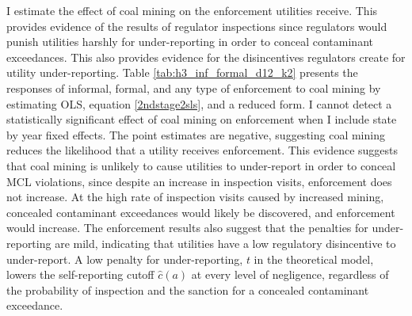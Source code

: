\documentclass[12pt]{article}
\begin{document}
I estimate the effect of coal mining on the enforcement utilities receive. This provides evidence of the results of regulator inspections since regulators would punish utilities harshly for under-reporting in order to conceal contaminant exceedances. This also provides evidence for the disincentives regulators create for utility under-reporting. Table \ref{tab:h3_inf_formal_d12_k2} presents the responses of informal, formal, and any type of enforcement to coal mining by estimating OLS, equation \ref{2ndstage2sls}, and a reduced form. I cannot detect a statistically significant effect of coal mining on enforcement when I include state by year fixed effects. The point estimates are negative, suggesting coal mining reduces the likelihood that a utility receives enforcement. This evidence suggests that coal mining is unlikely to cause utilities to under-report in order to conceal MCL violations, since despite an increase in inspection visits, enforcement does not increase. At the high rate of inspection visits caused by increased mining, concealed contaminant exceedances would likely be discovered, and enforcement would increase. The enforcement results also suggest that the penalties for under-reporting are mild, indicating that utilities have a low regulatory disincentive to under-report. A low penalty for under-reporting, $t$ in the theoretical model, lowers the self-reporting cutoff $\hat{c}(a)$ at every level of negligence, regardless of the probability of inspection and the sanction for a concealed contaminant exceedance.


\end{document}
